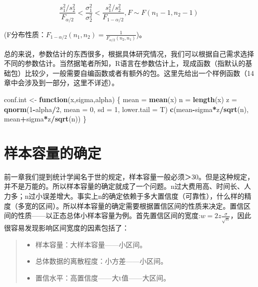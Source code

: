 \documentclass[]{ctexbook}
\newenvironment{Shaded}{\begin{snugshade}}{\end{snugshade}}
\newcommand{\ControlFlowTok}[1]{\textcolor[rgb]{0.13,0.29,0.53}{\textbf{#1}}}
\newcommand{\DataTypeTok}[1]{\textcolor[rgb]{0.13,0.29,0.53}{#1}}
\newcommand{\DecValTok}[1]{\textcolor[rgb]{0.00,0.00,0.81}{#1}}
\newcommand{\KeywordTok}[1]{\textcolor[rgb]{0.13,0.29,0.53}{\textbf{#1}}}
\newcommand{\NormalTok}[1]{#1}
\newcommand{\OperatorTok}[1]{\textcolor[rgb]{0.81,0.36,0.00}{\textbf{#1}}}
\newcommand{\StringTok}[1]{\textcolor[rgb]{0.31,0.60,0.02}{#1}}
\providecommand{\tightlist}{%
  \setlength{\itemsep}{0pt}\setlength{\parskip}{0pt}}
\begin{document}
\[\frac{s_1^2/s_2^2}{F_{\alpha/2}}<\frac{\sigma_1^2}{\sigma_2^2}<\frac{s_1^2/s_2^2}{F_{1-\alpha/2}},F\sim F(n_1-1,n_2-1)\]

(F分布性质：\(F_{1-\alpha/2}(n_1,n_2)=\frac{1}{F_{\alpha/2}(n_2,n_1)}\))。

总的来说，参数估计的东西很多，根据具体研究情况，我们可以根据自己需求选择不同的参数估计。当然据笔者所知，R语言在参数估计上，现成函数（指默认的基础包）比较少，一般需要自编函数或者有额外的包。这里先给出一个样例函数（14章中会涉及到一部分，这里不详述）。

\begin{Shaded}
\begin{Highlighting}[]
\NormalTok{conf.int <-}\StringTok{ }\ControlFlowTok{function}\NormalTok{(x,sigma,alpha) \{}
\NormalTok{  mean =}\StringTok{ }\KeywordTok{mean}\NormalTok{(x)}
\NormalTok{  n =}\StringTok{ }\KeywordTok{length}\NormalTok{(x)}
\NormalTok{  z =}\StringTok{ }\KeywordTok{qnorm}\NormalTok{(}\DecValTok{1}\OperatorTok{-}\NormalTok{alpha}\OperatorTok{/}\DecValTok{2}\NormalTok{, }\DataTypeTok{mean =} \DecValTok{0}\NormalTok{, }\DataTypeTok{sd =} \DecValTok{1}\NormalTok{, }\DataTypeTok{lower.tail =}\NormalTok{ T)}
  \KeywordTok{c}\NormalTok{(mean}\OperatorTok{-}\NormalTok{sigma}\OperatorTok{*}\NormalTok{z}\OperatorTok{/}\KeywordTok{sqrt}\NormalTok{(n), mean}\OperatorTok{+}\NormalTok{sigma}\OperatorTok{*}\NormalTok{z}\OperatorTok{/}\KeywordTok{sqrt}\NormalTok{(n))}
\NormalTok{  \}}
\end{Highlighting}
\end{Shaded}

\hypertarget{ux6837ux672cux5bb9ux91cfux7684ux786eux5b9a}{%
\section{样本容量的确定}\label{ux6837ux672cux5bb9ux91cfux7684ux786eux5b9a}}

前一章我们提到统计学闻名于世的规定，样本容量一般必须＞30。但是这种规定，并不是万能的。所以样本容量的确定就成了一个问题。n过大费用高、时间长、人力多；n过小误差增大。事实上n的确定依赖于多大置信度（可靠性），什么样的精度（多宽的区间）。所以样本容量的确定需要根据置信区间的性质来决定。置信区间的性质------以正态总体小样本容量为例。首先置信区间的宽度:\(w=2z\frac{\sigma}{\sqrt{n}}\)，因此很容易发现影响区间宽度的因素包括了：

\begin{quote}
\begin{itemize}
\tightlist
\item
  样本容量：大样本容量------小区间。
\item
  总体数据的离散程度：小方差------小区间。
\item
  置信水平：高置信度------大t值------大区间。
\end{itemize}
\end{quote}
\end{document}
